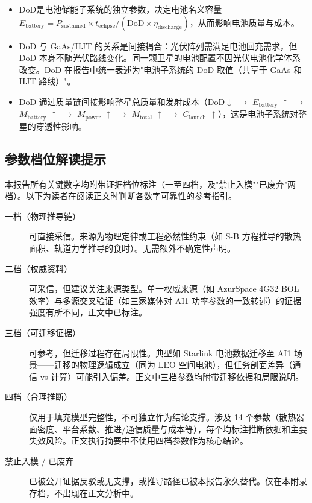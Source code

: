 \begin{itemize}
  \item DoD是电池储能子系统的独立参数，决定电池名义容量 $E_{\text{battery}} = P_{\text{sustained}} \times t_{\text{eclipse}} / (\text{DoD} \times \eta_{\text{discharge}})$，从而影响电池质量与成本。
  \item DoD 与 GaAs/HJT 的关系是间接耦合：光伏阵列需满足电池回充需求，但 DoD 本身不随光伏路线变化。同一颗卫星的电池配置不因光伏电池化学体系改变。DoD 在报告中统一表述为"电池子系统的 DoD 取值（共享于 GaAs 和 HJT 路线）"。
  \item DoD 通过质量链间接影响整星总质量和发射成本（DoD$\downarrow$ $\to$ $E_{\text{battery}}$ $\uparrow$ $\to$ $M_{\text{battery}}$ $\uparrow$ $\to$ $M_{\text{power}}$ $\uparrow$ $\to$ $M_{\text{total}}$ $\uparrow$ $\to$ $C_{\text{launch}}$ $\uparrow$），这是电池子系统对整星的穿透性影响。
\end{itemize}

\subsection{参数档位解读提示}
\label{sec:reading-guide}

本报告所有关键数字均附带证据档位标注（一至四档，及"禁止入模""已废弃"两档）。以下为读者在阅读正文时判断各数字可靠性的参考指引。

\begin{description}
  \item[一档（物理推导链）] 可直接采信。来源为物理定律或工程必然性约束（如 S-B 方程推导的散热面积、轨道力学推导的食时）。无需额外不确定性声明。

  \item[二档（权威资料）] 可采信，但建议关注来源类型。单一权威来源（如 AzurSpace 4G32 BOL 效率）与多源交叉验证（如三家媒体对 AI1 功率参数的一致转述）的证据强度有所不同，正文中已标注。

  \item[三档（可迁移证据）] 可参考，但迁移过程存在局限性。典型如 Starlink 电池数据迁移至 AI1 场景——迁移的物理逻辑成立（同为 LEO 空间电池），但任务剖面差异（通信 vs 计算）可能引入偏差。正文中三档参数均附带迁移依据和局限说明。

  \item[四档（合理推断）] 仅用于填充模型完整性，不可独立作为结论支撑。涉及 14 个参数（散热器面密度、平台系数、推进/通信质量与成本等），每个均标注推断依据和主要失效风险。正文执行摘要中不使用四档参数作为核心结论。

  \item[禁止入模 / 已废弃] 已被公开证据反驳或无支撑，或推导路径已被本报告永久替代。仅在本附录存档，不出现在正文分析中。
\end{description}

